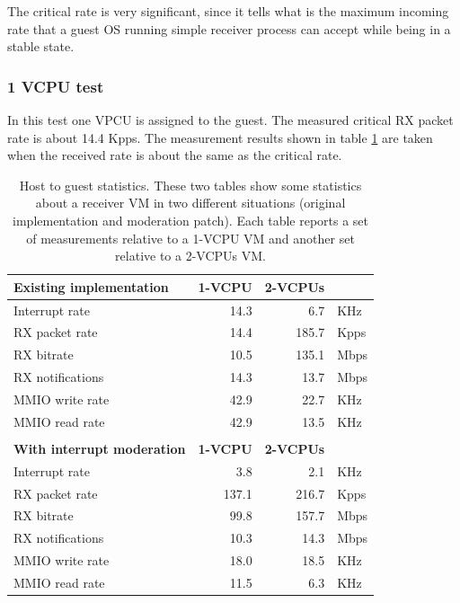 \vspace{0.5cm}

The critical rate is very significant, since it tells what is the maximum incoming rate that a guest OS running simple receiver process can
accept while being in a stable state.


\subsubsection{1 VCPU test}
\label{sec:e1000-rx-g2h1vcpu}
In this test one VPCU is assigned to the guest. The measured critical RX packet rate is about 14.4 Kpps.
The measurement results shown in table \ref{tab:e1000-rx-g2h1vcpu} are taken when the received rate is about the same as the critical
rate.

\begin{table}
\begin{center}
\begin{tabular}{lrrl}
\toprule
\textbf{Existing implementation} & \textbf{1-VCPU} & \textbf{2-VCPUs} & \\
\midrule
Interrupt rate & 14.3 & 6.7 & KHz\\
RX packet rate & 14.4 & 185.7 & Kpps\\
RX bitrate & 10.5 & 135.1 & Mbps\\
RX notifications & 14.3 & 13.7 & Mbps\\
MMIO write rate & 42.9 & 22.7 & KHz\\
MMIO read rate & 42.9 & 13.5 & KHz\\
\bottomrule
&&&\\
\toprule
\textbf{With interrupt moderation} & \textbf{1-VCPU} & \textbf{2-VCPUs} & \\
\midrule
Interrupt rate & 3.8 & 2.1 & KHz\\
RX packet rate & 137.1 & 216.7 & Kpps\\
RX bitrate & 99.8 & 157.7 & Mbps\\
RX notifications & 10.3 & 14.3 & Mbps\\
MMIO write rate & 18.0 & 18.5 & KHz\\
MMIO read rate & 11.5 & 6.3 & KHz\\
\bottomrule
\end{tabular}
\end{center}
\caption{Host to guest statistics. These two tables show some statistics about a receiver VM in two different situations (original
	 implementation and moderation patch). Each table reports a set of measurements relative to a 1-VCPU VM and another set relative
	 to a 2-VCPUs VM.}
\label{tab:e1000-rx-g2h1vcpu}
\end{table}

